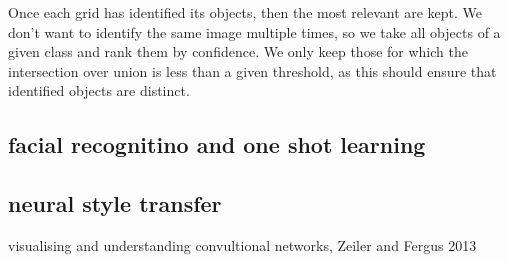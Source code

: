 \documentclass{article}
\begin{document}
Once each grid has identified its objects, then the most relevant are kept. We don't want to identify the same image multiple times, so we take all objects of a given class and rank them by confidence. We only keep those for which the intersection over union is less than a given threshold, as this should ensure that identified objects are distinct.

\subsection{facial recognitino and one shot learning}


\subsection{neural style transfer}
visualising and understanding convultional networks, Zeiler and Fergus 2013
\end{document}
